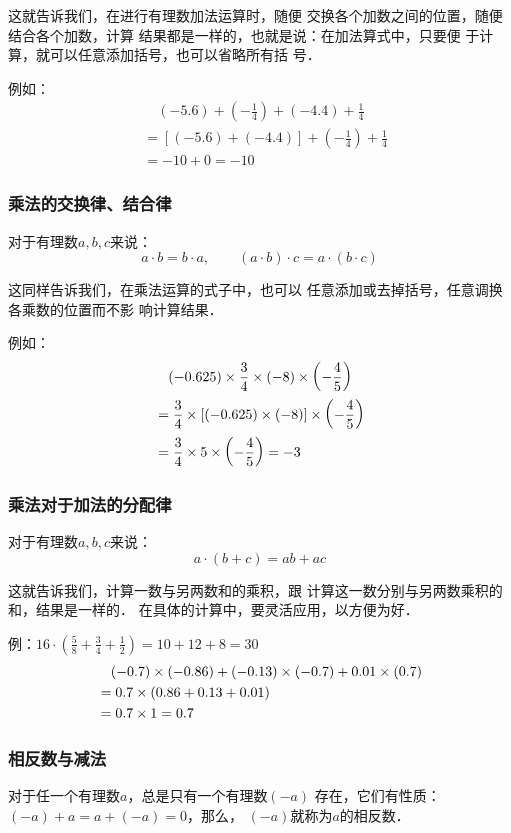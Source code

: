 这就告诉我们，在进行有理数加法运算时，随便
交换各个加数之间的位置，随便结合各个加数，计算
结果都是一样的，也就是说：在加法算式中，只要便
于计算，就可以任意添加括号，也可以省略所有括
号．

例如：
\[\begin{split}
&\quad (-5.6)+\left(-\frac{1}{4}\right)+(-4.4)+\frac{1}{4}\\
&=[(-5.6)+(-4.4)]+\left(-\frac{1}{4}\right)+\frac{1}{4}\\
&=-10+0=-10
\end{split}\]

\subsubsection{乘法的交换律、结合律}
\begin{blk}{}
	对于有理数$a, b, c$来说：
	\[ a\cdot b=b\cdot a,\qquad   (a\cdot b)\cdot c=a\cdot  (b\cdot  c)\]
\end{blk}


这同样告诉我们，在乘法运算的式子中，也可以
任意添加或去掉括号，任意调换各乘数的位置而不影
响计算结果．

例如：\[\begin{split}
&\quad  (-0.625)\times\dfrac{3}{4}\times(-8)\times\left(-\dfrac{4}{5}\right)\\
&=\dfrac{3}{4}\times[(-0.625)\times(-8)]\times\left(-\dfrac{4}{5}\right)\\
&=\dfrac{3}{4}\times5\times\left(-\dfrac{4}{5}\right)=-3
\end{split}\]


\subsubsection{乘法对于加法的分配律}
\begin{blk}{}
	对于有理数$a,  b,  c$来说：
	\[ a\cdot (b+c)=ab+ac\]
\end{blk}

这就告诉我们，计算一数与另两数和的乘积，跟
计算这一数分别与另两数乘积的和，结果是一样的．
在具体的计算中，要灵活应用，以方便为好．

例：$16\cdot \left(\frac{5}{8}+\frac{3}{4}+\frac{1}{2}\right)=10+12+8=30$
\[\begin{split}
&\quad (-0.7)\times (-0.86)+(-0.13)\times (-0.7)+0.01\times (0.7)\\
&=0.7\times (0.86+0.13+0.01)\\
&=0.7\times 1=0.7
\end{split}\]

\subsubsection{相反数与减法}
\begin{blk}{}
	对于任一个有理数$a$，总是只有一个有理数$(-a)$
	存在，它们有性质：$(-a) +a=a+(-a)=0$，那么，
	$(-a)$就称为$a$的相反数．
\end{blk}

